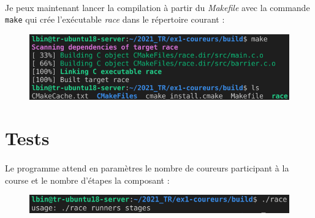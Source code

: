 \documentclass{article}
\begin{document}
    \paragraph{}
    Je peux maintenant lancer la compilation à partir du \emph{Makefile} avec la commande \texttt{make} qui crée l'exécutable \emph{race} dans le répertoire courant :
    \begin{figure}[H]
        \centering
        \includegraphics[width=.6\textwidth]{./screenshots/make.png}
    \end{figure}


    \newpage
    \section{Tests}
    \paragraph{}
    Le programme attend en paramètres le nombre de coureurs participant à la course et le nombre d'étapes la composant :
    \begin{figure}[H]
        \centering
        \includegraphics[width=.58\textwidth]{./screenshots/params.png}
    \end{figure}
    
\end{document}
